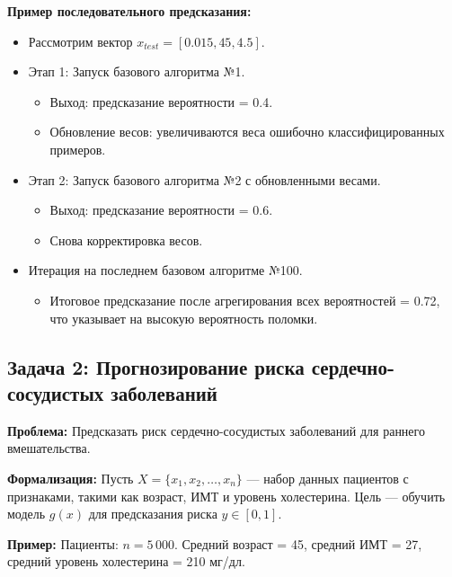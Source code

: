 \textbf{Пример последовательного предсказания:}
\begin{itemize}
    \item Рассмотрим вектор $x_{test} = [0.015, 45, 4.5]$.
    \item Этап 1: Запуск базового алгоритма №1.
          \begin{itemize}
              \item Выход: предсказание вероятности = 0.4.
              \item Обновление весов: увеличиваются веса ошибочно классифицированных примеров.
          \end{itemize}
    \item Этап 2: Запуск базового алгоритма №2 с обновленными весами.
          \begin{itemize}
              \item Выход: предсказание вероятности = 0.6.
              \item Снова корректировка весов.
          \end{itemize}
    \item Итерация на последнем базовом алгоритме №100.
          \begin{itemize}
              \item Итоговое предсказание после агрегирования всех вероятностей = 0.72, что указывает на высокую вероятность поломки.
          \end{itemize}
\end{itemize}


\subsection*{Задача 2: Прогнозирование риска сердечно-сосудистых заболеваний}

\textbf{Проблема:} Предсказать риск сердечно-сосудистых заболеваний для раннего вмешательства.

\textbf{Формализация:}
Пусть $X = \{x_1, x_2, \ldots, x_n\}$ — набор данных пациентов с признаками, такими как возраст, ИМТ и уровень холестерина. Цель — обучить модель $g(x)$ для предсказания риска $y \in [0, 1]$.

\textbf{Пример:}
Пациенты: $n = 5\,000$. Средний возраст = 45, средний ИМТ = 27, средний уровень холестерина = 210 мг/дл.


